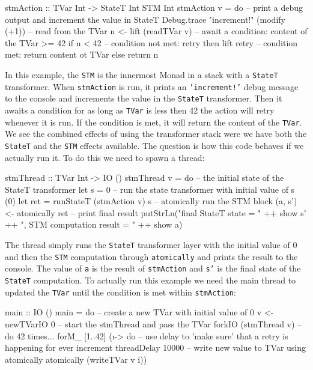 \begin{HaskellCode}
stmAction :: TVar Int -> StateT Int STM Int 
stmAction v = do
  -- print a debug output and increment the value in StateT 
  Debug.trace "increment!" (modify (+1))
  -- read from the TVar
  n <- lift (readTVar v)
  -- await a condition: content of the TVar >= 42
  if n < 42
    -- condition not met: retry
    then lift retry
    -- condition met: return content ot TVar
    else return n
\end{HaskellCode}

In this example, the \texttt{STM} is the innermost Monad in a stack with a \texttt{StateT} transformer. When \texttt{stmAction} is run, it prints an \texttt{'increment!'} debug message to the console and increments the value in the \texttt{StateT} transformer. Then it awaits a condition for as long as \texttt{TVar} is less then 42 the action will retry whenever it is run. If the condition is met, it will return the content of the \texttt{TVar}. We see the combined effects of using the transformer stack were we have both the \texttt{StateT} and the \texttt{STM} effects available. The question is how this code behaves if we actually run it. To do this we need to spawn a thread:

\begin{HaskellCode}
stmThread :: TVar Int -> IO ()
stmThread v = do
  -- the initial state of the StateT transformer
  let s = 0
  -- run the state transformer with initial value of s (0)
  let ret = runStateT (stmAction v) s
  -- atomically run the STM block
  (a, s') <- atomically ret
  -- print final result
  putStrLn("final StateT state     = " ++ show s' ++
           ", STM computation result = " ++ show a)
\end{HaskellCode}

The thread simply runs the \texttt{StateT} transformer layer with the initial value of 0 and then the \texttt{STM} computation through \texttt{atomically} and prints the result to the console. The value of \texttt{a} is the result of \texttt{stmAction} and \texttt{s'} is the final state of the \texttt{StateT} computation. To actually run this example we need the main thread to updated the \texttt{TVar} until the condition is met within \texttt{stmAction}:

\begin{HaskellCode}
main :: IO ()
main = do
  -- create a new TVar with initial value of 0
  v <- newTVarIO 0 
  -- start the stmThread and pass the TVar
  forkIO (stmThread v)
  -- do 42 times...
  forM_ [1..42] (\i -> do
    -- use delay to 'make sure' that a retry is happening for ever increment
    threadDelay 10000
    -- write new value to TVar using atomically
    atomically (writeTVar v i))
\end{HaskellCode}


